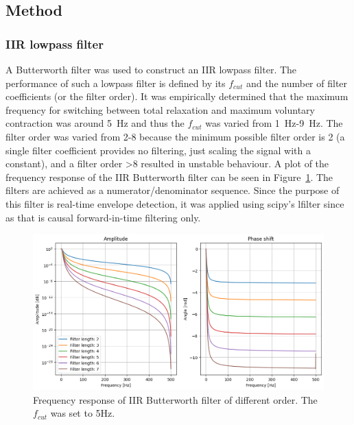 \subsection{Method}
\subsubsection{IIR lowpass filter}
A Butterworth filter was used to construct an IIR lowpass filter. The performance of such a lowpass filter is defined by its $f_{cut}$ and the number of filter coefficients (or the filter order). It was empirically determined that the maximum frequency for switching between total relaxation and maximum voluntary contraction was around \SI{5}{\hertz} and thus the $f_{cut}$ was varied from \SI{1}{\hertz}-\SI{9}{\hertz}. The filter order was varied from 2-8 because the minimum possible filter order is 2 (a single filter coefficient provides no filtering, just scaling the signal with a constant), and a filter order >8 resulted in unstable behaviour. A plot of the frequency response of the IIR Butterworth filter can be seen in Figure~\ref{fig:iir_frequencyresponse_coefficients}. The filters are achieved as a numerator/denominator sequence. Since the purpose of this filter is real-time envelope detection, it was applied using scipy's lfilter since as that is causal forward-in-time filtering only.


\begin{figure}[h!t]
	\begin{center}
		\includegraphics[width=1.0\columnwidth]{images/iir_frequencyresponse_coefficients.png}
	\end{center}
	\caption{Frequency response of IIR Butterworth filter of different order. The $f_{cut}$ was set to 5Hz.}
	\label{fig:iir_frequencyresponse_coefficients}
\end{figure}

